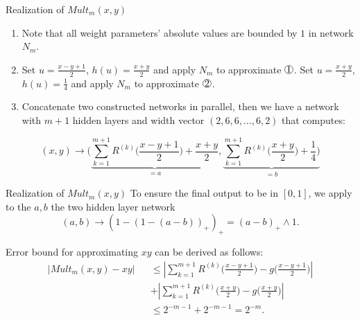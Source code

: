 \documentclass{if-beamer}
\newcommand*\circled[1]{\tikz[baseline=(char.base)]{
            \node[shape=circle,draw,inner sep=0.2pt] (char) {#1};}}
\begin{document}
\begin{frame}{Realization of $Mult_{m}(x,y)$}
    \begin{enumerate}
        \item Note that all weight parameters' absolute values are bounded by $1$ in network $N_m$.
        \item Set $u=\frac{x-y+1}{2}$, $h(u)=\frac{x+y}{2}$ and apply $N_m$ to approximate $\circled{1}$. Set $u=\frac{x+y}{2}$, $h(u)=\frac{1}{4}$ and apply $N_m$ to approximate $\circled{2}$. 
        \item Concatenate two constructed networks in parallel, then we have a network with $m+1$ hidden layers and width vector $(2,6,6,\dots,6,2)$ that computes:
    \end{enumerate}
     \begin{equation*}
        (x,y) \rightarrow{\bigg(\underbrace{\sum_{k=1}^{m+1}R^{(k)}\bigg(\frac{x-y+1}{2}\bigg)+\frac{x+y}{2}}_{=a},\underbrace{\sum_{k=1}^{m+1}R^{(k)}\bigg(\frac{x+y}{2}\bigg)+\frac{1}{4}\bigg)}_{=b}}
    \end{equation*}
\end{frame}

\begin{frame}{Realization of $Mult_{m}(x,y)$}
To ensure the final output to be in $[0,1]$, we apply to the $a, b$ the two hidden layer network 
\begin{equation*}
    (a,b)\rightarrow{(1-(1-(a-b))_{+})_{+}}=(a-b)_{+}\wedge 1.
\end{equation*}

Error bound for approximating $xy$ can be derived as follows:
\begin{eqnarray*}
    \left|Mult_{m}(x,y)-xy\right| &&\leq \left| \sum_{k=1}^{m+1}R^{(k)}\bigg(\frac{x-y+1}{2}\bigg) - g\bigg( \frac{x-y+1}{2} \bigg) \right| \\
    && + \left| \sum_{k=1}^{m+1}R^{(k)}\bigg(\frac{x+y}{2}\bigg) - g\bigg( \frac{x+y}{2} \bigg) \right| \\
    && \leq 2^{-m-1}+2^{-m-1} = 2^{-m}.
\end{eqnarray*}
\end{frame}
\end{document}
